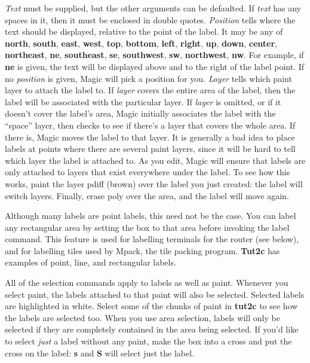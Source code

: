 \documentclass[letterpaper,twoside,12pt]{article}
\begin{document}
{\itshape Text} must be supplied, but the other arguments can be
defaulted.  If {\itshape text} has any spaces in it, then it must
be enclosed in double quotes.  {\itshape Position} tells where
the text should be displayed, relative to the point of the
label.  It may be any of {\bfseries north}, {\bfseries south}, {\bfseries east},
{\bfseries west}, {\bfseries top}, {\bfseries bottom}, {\bfseries left},
{\bfseries right}, {\bfseries up}, {\bfseries down}, {\bfseries center},
{\bfseries northeast}, {\bfseries ne}, {\bfseries southeast}, {\bfseries se},
{\bfseries southwest}, {\bfseries sw}, {\bfseries northwest}, {\bfseries nw}.
For example, if {\bfseries ne} is given, the text will be displayed above and
to the right of the label point.  If no {\itshape position} is given,
Magic will pick a position for you.  {\itshape Layer} tells which paint
layer to attach the label to.  If {\itshape layer} covers the entire
area of the label, then the label will be associated with the
particular layer.  If {\itshape layer} is omitted, or if it doesn't
cover the label's area, Magic initially associates the label with
the ``space'' layer, then checks to see if there's a layer that covers the
whole area.  If there is, Magic moves the label to that layer.
It is generally a bad idea to place labels
at points where there are several paint layers, since it will
be hard to tell which layer the label is attached to.
As you edit, Magic will ensure that labels are only
attached to layers that exist everywhere under the label.
To see how this works,
paint the layer pdiff (brown) over the label you just
created:  the label will
switch layers.  Finally, erase poly over the area, and
the label will move again.

Although many labels are point labels, this need not be the case.
You can label any rectangular area by setting the box to that
area before invoking the label command.  This feature is used for
labelling terminals for the router (see below), and for labelling tiles used
by Mpack, the tile packing program.  {\bfseries Tut2c} has examples of
point, line, and rectangular labels.

All of the selection commands apply to labels as well as paint.
Whenever you select paint, the labels attached to that paint
will also be selected.  Selected labels are highlighted in white.
Select some of the chunks of paint in {\bfseries tut2c}
to see how the labels are selected too.  When you use
area selection, labels will only be selected if they are completely
contained in the area being selected.  If you'd like to select
{\itshape just} a label without any paint, make the box into a cross
and put the cross on the label:  {\bfseries s} and {\bfseries S} will select
just the label.
\end{document}
